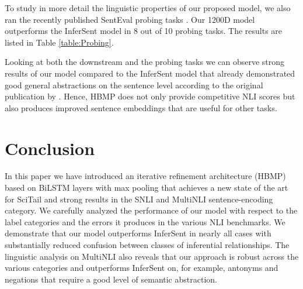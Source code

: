 \documentclass{nle}
\begin{document}
\begin{table*}[ht!]
\begin{center}
\end{center}
\caption{\label{table:Probing} SentEval probing task results (accuracy \%). InferSent results are BiLSTM Max (NLI) results as reported by \cite{probing}.}
\end{table*}

To study in more detail the linguistic properties of our proposed model, we also ran the recently published SentEval probing tasks \citep{probing}. Our 1200D model outperforms the InferSent model in 8 out of 10 probing tasks. The results are listed in Table \ref{table:Probing}.

Looking at both the downstream and the probing tasks we can observe strong results of our model compared to the InferSent model that already demonstrated good general abstractions on the sentence level according to the original publication by \cite{infersent}. Hence, HBMP does not only provide competitive NLI scores but also produces improved sentence embeddings that are useful for other tasks.

\section{Conclusion}

In this paper we have introduced an iterative refinement architecture (HBMP) based on BiLSTM layers with max pooling that achieves a new state of the art for SciTail and strong results in the SNLI and MultiNLI sentence-encoding category. We carefully analyzed the performance of our model with respect to the label categories and the errors it produces in the various NLI benchmarks. We demonstrate that our model outperforms InferSent in nearly all cases with substantially reduced confusion between classes of inferential relationships.
The linguistic analysis on MultiNLI also reveals that our approach is robust across the various categories and outperforms InferSent on, for example, antonyms and negations that require a good level of semantic abstraction.
\end{document}
